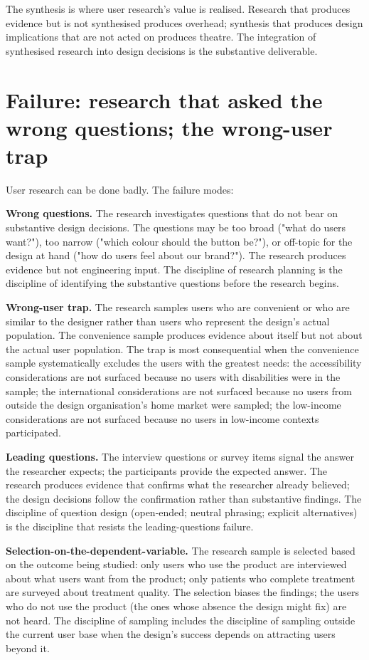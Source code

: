 The synthesis is where user research's value is realised. Research that produces evidence but is not synthesised produces overhead; synthesis that produces design implications that are not acted on produces theatre. The integration of synthesised research into design decisions is the substantive deliverable.

\section{Failure: research that asked the wrong questions; the wrong-user trap}

User research can be done badly. The failure modes:

\textbf{Wrong questions.} The research investigates questions that do not bear on substantive design decisions. The questions may be too broad ("what do users want?"), too narrow ("which colour should the button be?"), or off-topic for the design at hand ("how do users feel about our brand?"). The research produces evidence but not engineering input. The discipline of research planning is the discipline of identifying the substantive questions before the research begins.

\textbf{Wrong-user trap.} The research samples users who are convenient or who are similar to the designer rather than users who represent the design's actual population. The convenience sample produces evidence about itself but not about the actual user population. The trap is most consequential when the convenience sample systematically excludes the users with the greatest needs: the accessibility considerations are not surfaced because no users with disabilities were in the sample; the international considerations are not surfaced because no users from outside the design organisation's home market were sampled; the low-income considerations are not surfaced because no users in low-income contexts participated.

\textbf{Leading questions.} The interview questions or survey items signal the answer the researcher expects; the participants provide the expected answer. The research produces evidence that confirms what the researcher already believed; the design decisions follow the confirmation rather than substantive findings. The discipline of question design (open-ended; neutral phrasing; explicit alternatives) is the discipline that resists the leading-questions failure.

\textbf{Selection-on-the-dependent-variable.} The research sample is selected based on the outcome being studied: only users who use the product are interviewed about what users want from the product; only patients who complete treatment are surveyed about treatment quality. The selection biases the findings; the users who do not use the product (the ones whose absence the design might fix) are not heard. The discipline of sampling includes the discipline of sampling outside the current user base when the design's success depends on attracting users beyond it.

